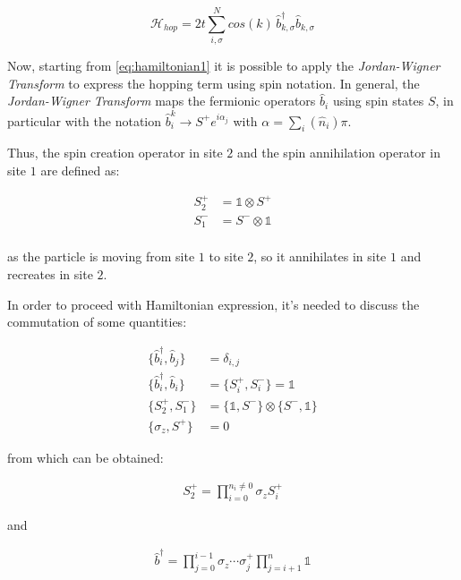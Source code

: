 \documentclass[twoside,twocolumn]{article}
\begin{document}
$$
\mathcal{H}_{hop} = 2t \sum_{i,\sigma}^{N}{cos(k) \,}\hat{b}^{\dagger}_{k,\sigma}\hat{b}_{k,\sigma}
$$

Now, starting from \ref{eq:hamiltonian1} it is possible to apply the \textit{Jordan-Wigner Transform}
to express the hopping term using spin notation. In general, the \textit{Jordan-Wigner Transform} maps
the fermionic operators $\hat{b}_i$ using spin states $S$, in particular with the notation
$\hat{b}^k_i \rightarrow S^+ e^{i\alpha_j}$ with $\alpha = \sum_i{(\hat{n}_i)}\pi$.

Thus, the spin creation operator in site $2$ and the spin annihilation operator in site $1$ are defined as:

\begin{equation}
\begin{aligned}
S^+_2 &= \mathbb{1} \otimes S^+\\
S^-_1 &= S^- \otimes \mathbb{1} \\
\end{aligned}
\end{equation}

as the particle is moving from site $1$ to site $2$, so it annihilates in site $1$ and recreates in site $2$.

In order to proceed with Hamiltonian expression, it's needed to discuss the commutation of some quantities:

\begin{equation}
\begin{aligned}
\{\hat{b}^\dagger_i,\hat{b}_j\} &= \delta_{i,j}\\
\{\hat{b}^\dagger_i,\hat{b}_i\} &= \{S^+_i,S^-_i\} = \mathbb{1}\\
\{S^+_2,S^-_1\} &= \{\mathbb{1},S^-\} \otimes \{S^-,\mathbb{1}\}\\
\{\sigma_z,S^+\} &= 0
\end{aligned}
\end{equation}

from which can be obtained:

\begin{equation}
\begin{aligned}
S^+_2 = \prod_{i=0}^{n_i \neq 0}{\sigma_z S^+_i}
\end{aligned}
\end{equation}

and

\begin{equation}\label{eq:b_chain}
\begin{aligned}
\hat{b}^\dagger = \prod_{j=0}^{i-1}{\sigma_z \cdots \sigma^+_j} \prod_{j=i+1}^n{\mathbb{1}}
\end{aligned}
\end{equation}
\end{document}
